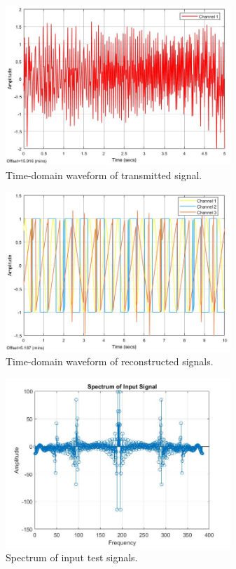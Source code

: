 \documentclass[conference]{IEEEtran}
\begin{document}
\begin{figure}
    \centering
    \includegraphics[width = 8.5cm]{transmitted_signal.jpg}
    \caption{Time-domain waveform of transmitted signal.}
    \label{fig:transmitted_signal}
\end{figure}

\begin{figure}
    \centering
    \includegraphics[width = 8.5cm]{reconstructed_signal.jpg}
    \caption{Time-domain waveform of reconstructed signals.}
    \label{fig:reconstructed_signals}
\end{figure}

\begin{figure}[htpb]
    \centering
    \includegraphics[width = 8.5cm]{Input_Spectrum.jpg}
    \caption{Spectrum of input test signals.}
    \label{fig:input_spectrum}
\end{figure}
\end{document}
